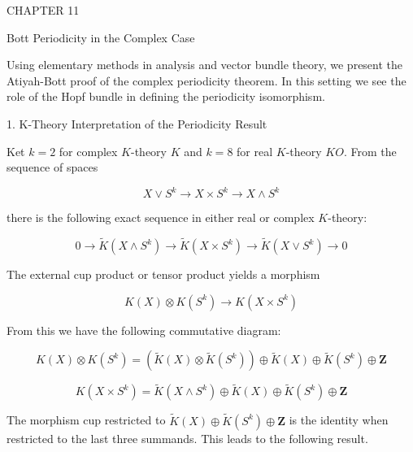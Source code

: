 CHAPTER 11

Bott Periodicity in the Complex Case

Using elementary methods in analysis and vector bundle theory, we present the Atiyah-Bott proof of the complex periodicity theorem. In this setting we see the role of the Hopf bundle in defining the periodicity isomorphism.

1. K-Theory Interpretation of the Periodicity Result

Ket $k = 2$ for complex $K$-theory $K$ and $k = 8$ for real $K$-theory $KO$. From the sequence of spaces

$$X \vee S^k \rightarrow X \times S^k \rightarrow X \wedge S^k$$

there is the following exact sequence in either real or complex $K$-theory:

$$0 \rightarrow \tilde{K}(X \wedge S^k) \rightarrow \tilde{K}(X \times S^k) \rightarrow \tilde{K}(X \vee S^k) \rightarrow 0$$

The external cup product or tensor product yields a morphism

$$K(X) \otimes K(S^k) \rightarrow K(X \times S^k)$$

From this we have the following commutative diagram:

$$K(X) \otimes K(S^k) = (\tilde{K}(X) \otimes \tilde{K}(S^k)) \oplus \tilde{K}(X) \oplus \tilde{K}(S^k) \oplus \mathbf{Z}$$

$$K(X \times S^k) = \tilde{K}(X \wedge S^k) \oplus \tilde{K}(X) \oplus \tilde{K}(S^k) \oplus \mathbf{Z}$$

The morphism cup restricted to $\tilde{K}(X) \oplus \tilde{K}(S^k) \oplus \mathbf{Z}$ is the identity when restricted to the last three summands. This leads to the following result.
